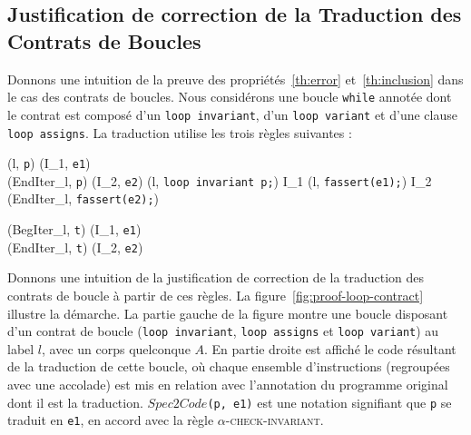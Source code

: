 \subsection{Justification de correction de la Traduction des Contrats de
  Boucles}


Donnons une intuition de la preuve des propriétés~\ref{th:error}
et~\ref{th:inclusion} dans le cas des contrats de boucles.
Nous considérons une boucle \lstinline'while' annotée dont le contrat est
composé d'un \lstinline'loop invariant', d'un \lstinline'loop variant' et
d'une clause \lstinline'loop assigns'.
La traduction utilise les trois règles suivantes :


{\scriptsize
  {
    {}
    {
    }{}
  }
}

{\scriptsize
  {
    {(l, \mbox{\lstinline'p'})  (I_1, \mbox{\lstinline'e1'}) \\
      (EndIter_l, \mbox{\lstinline'p'})  (I_2, \mbox{\lstinline'e2'})}
    {
      (l, \mbox{\lstinline'loop invariant p;'}) 
      I_1 \concat (l, \mbox{\lstinline'fassert(e1);'})
      \concat I_2 \concat (EndIter_l, \mbox{\lstinline'fassert(e2);'})
    }{}
  }
}

{\scriptsize
  {
    {
      (BegIter_l, \mbox{\lstinline't'})  (I_1, \mbox{\lstinline'e1'})
      \\
      (EndIter_l, \mbox{\lstinline't'})  (I_2, \mbox{\lstinline'e2'})
    }
    {
    }{}
  }
}


Donnons une intuition de la justification de correction de la traduction des
contrats de boucle à partir de ces règles.
La figure~\ref{fig:proof-loop-contract} illustre la démarche.
La partie gauche de la figure montre une boucle disposant d'un contrat de boucle
(\lstinline'loop invariant', \lstinline'loop assigns' et
\lstinline'loop variant') au label $l$, avec un corps quelconque $A$.
En partie droite est affiché le code résultant de la traduction de cette
boucle, où chaque ensemble d'instructions (regroupées avec une accolade) est
mis en relation avec l'annotation du programme original dont il est la
traduction.
$\mathit{Spec2Code}$\lstinline'(p, e1)' est une notation signifiant que
\lstinline'p' se traduit en \lstinline'e1', en accord avec la règle
\textsc{$\alpha$-check-invariant}.

